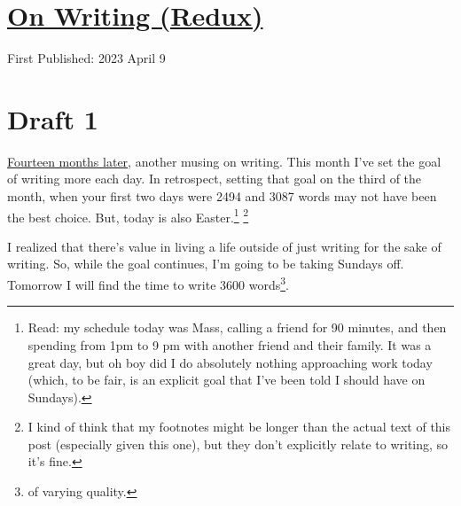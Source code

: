 \documentclass[12pt]{article}[titlepage]
\newcommand{\1}{\={a}}
\newcommand{\2}{\={e}}
\newcommand{\3}{\={\i}}
\newcommand{\4}{\=o}
\newcommand{\5}{\=u}
\newcommand{\6}{\={A}}
\renewcommand{\,}{\textsuperscript{,}}
\begin{document}
\doublespacing
\section{\href{writing-3.html}{On Writing (Redux)}}
First Published: 2023 April 9

\section{Draft 1}
\href{writing-2.html}{Fourteen months later}, another musing on writing.
This month I've set the goal of writing more each day.
In retrospect, setting that goal on the third of the month, when your first two days were 2494 and 3087 words may not have been the best choice.
But, today is also Easter.\footnote{Read: my schedule today was Mass, calling a friend for 90 minutes, and then spending from 1pm to 9 pm with another friend and their family. It was a great day, but oh boy did I do absolutely nothing approaching work today (which, to be fair, is an explicit goal that I've been told I should have on Sundays).}
\footnote{I kind of think that my footnotes might be longer than the actual text of this post (especially given this one), but they don't explicitly relate to writing, so it's fine.}

I realized that there's value in living a life outside of just writing for the sake of writing.
So, while the goal continues, I'm going to be taking Sundays off.
Tomorrow I will find the time to write 3600 words\footnote{of varying quality.}.
\end{document}

